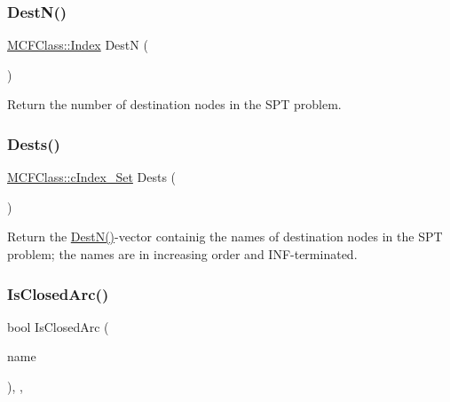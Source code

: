 \subsubsection{\texorpdfstring{Dest\+N()}{DestN()}}
{\footnotesize\ttfamily \mbox{\hyperlink{class_m_c_f_class_ad53d6229d7ec28555a9c9c2fd9abf773}{M\+C\+F\+Class\+::\+Index}} DestN (\begin{DoxyParamCaption}\item[{void}]{ }\end{DoxyParamCaption})\hspace{0.3cm}{\ttfamily [inline]}}

Return the number of destination nodes in the S\+PT problem. \mbox{\label{class_s_p_tree_a0c4139e9f19c46099f798ec496faca2c}} 
\subsubsection{\texorpdfstring{Dests()}{Dests()}}
{\footnotesize\ttfamily \mbox{\hyperlink{class_m_c_f_class_a81575b2d4e4d5636b17170432150ae69}{M\+C\+F\+Class\+::c\+Index\+\_\+\+Set}} Dests (\begin{DoxyParamCaption}\item[{void}]{ }\end{DoxyParamCaption})\hspace{0.3cm}{\ttfamily [inline]}}

Return the \mbox{\hyperlink{class_s_p_tree_adfad352a13e6be066a344f09b34148da}{Dest\+N()}}-\/vector containig the names of destination nodes in the S\+PT problem; the names are in increasing order and I\+N\+F-\/terminated. \mbox{\label{class_s_p_tree_a95d97fdf20e0075a8deda52f4925072a}} 
\subsubsection{\texorpdfstring{Is\+Closed\+Arc()}{IsClosedArc()}}
{\footnotesize\ttfamily bool Is\+Closed\+Arc (\begin{DoxyParamCaption}\item[{\mbox{\hyperlink{class_m_c_f_class_a76aaabb20535c51a2752b93f6c38fe54}{c\+Index}}}]{name }\end{DoxyParamCaption})\hspace{0.3cm}{\ttfamily [inline]}, {\ttfamily [override]}, {\ttfamily [virtual]}}

